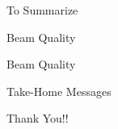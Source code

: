\documentclass[11pt]{beamer}
\begin{document}
	\begin{frame}{To Summarize}
		
	\end{frame}
	
	\begin{frame}{Beam Quality}
		
	\end{frame}
	
	\begin{frame}{Beam Quality}
		
	\end{frame}
	
	\begin{frame}{Take-Home Messages}
		
	\end{frame}
	
	\begin{frame}
		\begin{center}
		\LARGE Thank You!!
		\end{center}
	
    \end{frame}
	
	
\end{document}
